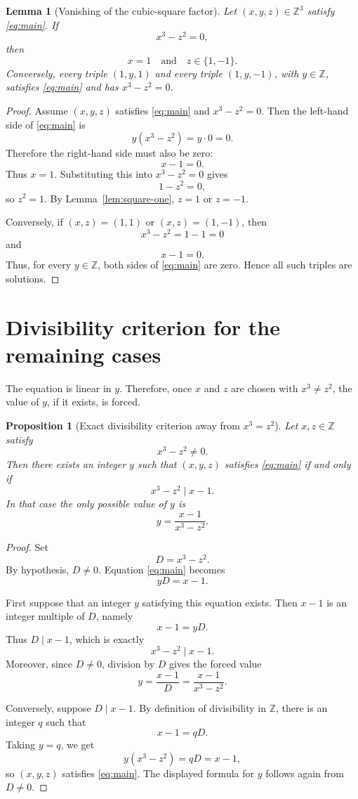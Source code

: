 \documentclass[11pt]{article}
\newtheorem{lemma}{Lemma}
\newtheorem{proposition}{Proposition}
\begin{document}
\begin{lemma}[Vanishing of the cubic-square factor]\label{lem:vanishing-factor}
Let \((x,y,z)\in\mathbb Z^3\) satisfy \eqref{eq:main}.  If
\[
    x^3-z^2=0,
\]
then
\[
    x=1\quad\text{and}\quad z\in\{1,-1\}.
\]
Conversely, every triple \((1,y,1)\) and every triple \((1,y,-1)\), with \(y\in\mathbb Z\), satisfies \eqref{eq:main} and has \(x^3-z^2=0\).
\end{lemma}

\begin{proof}
Assume \((x,y,z)\) satisfies \eqref{eq:main} and \(x^3-z^2=0\).  Then the left-hand side of \eqref{eq:main} is
\[
    y(x^3-z^2)=y\cdot 0=0.
\]
Therefore the right-hand side must also be zero:
\[
    x-1=0.
\]
Thus \(x=1\).  Substituting this into \(x^3-z^2=0\) gives
\[
    1-z^2=0,
\]
so \(z^2=1\).  By Lemma~\ref{lem:square-one}, \(z=1\) or \(z=-1\).

Conversely, if \((x,z)=(1,1)\) or \((x,z)=(1,-1)\), then
\[
    x^3-z^2=1-1=0
\]
and
\[
    x-1=0.
\]
Thus, for every \(y\in\mathbb Z\), both sides of \eqref{eq:main} are zero.  Hence all such triples are solutions.
\end{proof}

\section{Divisibility criterion for the remaining cases}

The equation is linear in \(y\).  Therefore, once \(x\) and \(z\) are chosen with \(x^3\ne z^2\), the value of \(y\), if it exists, is forced.

\begin{proposition}[Exact divisibility criterion away from \(x^3=z^2\)]\label{prop:divisibility}
Let \(x,z\in\mathbb Z\) satisfy
\[
    x^3-z^2\ne 0.
\]
Then there exists an integer \(y\) such that \((x,y,z)\) satisfies \eqref{eq:main} if and only if
\[
    x^3-z^2 \mid x-1.
\]
In that case the only possible value of \(y\) is
\[
    y=\frac{x-1}{x^3-z^2}.
\]
\end{proposition}

\begin{proof}
Set
\[
    D=x^3-z^2.
\]
By hypothesis, \(D\ne 0\).  Equation \eqref{eq:main} becomes
\[
    yD=x-1.
\]

First suppose that an integer \(y\) satisfying this equation exists.  Then \(x-1\) is an integer multiple of \(D\), namely
\[
    x-1=yD.
\]
Thus \(D\mid x-1\), which is exactly
\[
    x^3-z^2\mid x-1.
\]
Moreover, since \(D\ne 0\), division by \(D\) gives the forced value
\[
    y=\frac{x-1}{D}=\frac{x-1}{x^3-z^2}.
\]

Conversely, suppose \(D\mid x-1\).  By definition of divisibility in \(\mathbb Z\), there is an integer \(q\) such that
\[
    x-1=qD.
\]
Taking \(y=q\), we get
\[
    y(x^3-z^2)=qD=x-1,
\]
so \((x,y,z)\) satisfies \eqref{eq:main}.  The displayed formula for \(y\) follows again from \(D\ne 0\).
\end{proof}
\end{document}
